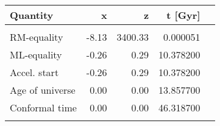 \begin{tabular}{lrrrl}
Quantity & x & z & t [Gyr] &  \\
\hline\\
RM-equality  & -8.13 & 3400.33 & 0.000051 &   \\
ML-equality  & -0.26 & 0.29 & 10.378200 &   \\
Accel. start  & -0.26 & 0.29 & 10.378200 &    \\
Age of universe  & 0.00 & 0.00 & 13.857700 &   \\
Conformal time  & 0.00 & 0.00 & 46.318700 &   \\
\hline\\
\end{tabular}

